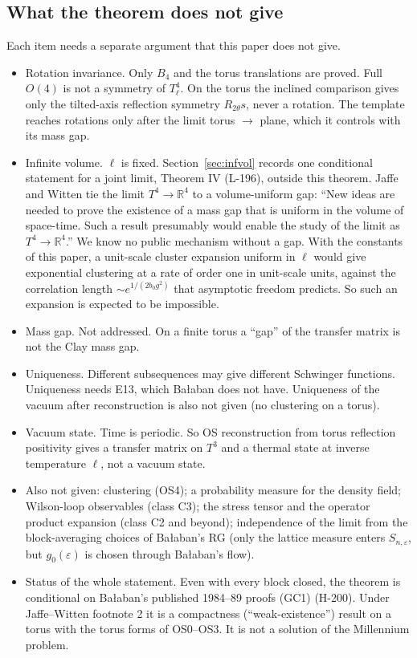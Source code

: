 \subsection{What the theorem does not give}\label{sec:notgiven}
Each item needs a separate argument that this paper does not give.
\begin{itemize}
\item Rotation invariance. Only $B_4$ and the torus translations are proved. Full $O(4)$ is not a symmetry of $T^4_\ell$. On the torus the inclined comparison gives only the tilted-axis reflection symmetry $R_{2\theta}s$, never a rotation. The template \cite{OAI26-O3} reaches rotations only after the limit torus $\to$ plane, which it controls with its mass gap.
\item Infinite volume. $\ell$ is fixed. Section~\ref{sec:infvol} records one conditional statement for a joint limit, Theorem IV (L-196), outside this theorem. Jaffe and Witten tie the limit $T^4\to\mathbb R^4$ to a volume-uniform gap: ``New ideas are needed to prove the existence of a mass gap that is uniform in the volume of space-time. Such a result presumably would enable the study of the limit as $T^4\to\mathbb R^4$.'' We know no public mechanism without a gap. With the constants of this paper, a unit-scale cluster expansion uniform in $\ell$ would give exponential clustering at a rate of order one in unit-scale units, against the correlation length $\sim e^{1/(2b_0g^2)}$ that asymptotic freedom predicts. So such an expansion is expected to be impossible.
\item Mass gap. Not addressed. On a finite torus a ``gap'' of the transfer matrix is not the Clay mass gap.
\item Uniqueness. Different subsequences may give different Schwinger functions. Uniqueness needs E13, which Ba{\l}aban does not have. Uniqueness of the vacuum after reconstruction is also not given (no clustering on a torus).
\item\label{corr:thermal} Vacuum state. Time is periodic. So OS reconstruction from torus reflection positivity gives a transfer matrix on $T^3$ and a thermal state at inverse temperature $\ell$, not a vacuum state.
\item Also not given: clustering (OS4); a probability measure for the density field; Wilson-loop observables (class C3); the stress tensor and the operator product expansion (class C2 and beyond); independence of the limit from the block-averaging choices of Ba{\l}aban's RG (only the lattice measure enters $S_{n,\varepsilon}$, but $g_0(\varepsilon)$ is chosen through Ba{\l}aban's flow).
\item Status of the whole statement. Even with every block closed, the theorem is conditional on Ba{\l}aban's published 1984--89 proofs (GC1) (H-200). Under Jaffe--Witten footnote 2 it is a compactness (``weak-existence'') result on a torus with the torus forms of OS0--OS3. It is not a solution of the Millennium problem.
\end{itemize}

